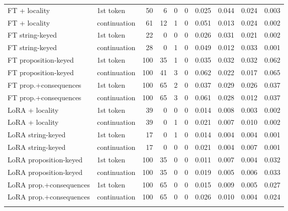 \begin{tabular}{llrrrrrrrr}
FT + locality & 1st token & 50 & 6 & 0 & 0 & 0.025 & 0.044 & 0.024 & 0.003 \\
FT + locality & continuation & 61 & 12 & 1 & 0 & 0.051 & 0.013 & 0.024 & 0.002 \\
FT string-keyed & 1st token & 22 & 0 & 0 & 0 & 0.026 & 0.031 & 0.021 & 0.002 \\
FT string-keyed & continuation & 28 & 0 & 1 & 0 & 0.049 & 0.012 & 0.033 & 0.001 \\
FT proposition-keyed & 1st token & 100 & 35 & 1 & 0 & 0.035 & 0.032 & 0.032 & 0.062 \\
FT proposition-keyed & continuation & 100 & 41 & 3 & 0 & 0.062 & 0.022 & 0.017 & 0.065 \\
FT prop.+consequences & 1st token & 100 & 65 & 2 & 0 & 0.037 & 0.029 & 0.026 & 0.037 \\
FT prop.+consequences & continuation & 100 & 65 & 3 & 0 & 0.061 & 0.028 & 0.012 & 0.037 \\
LoRA + locality & 1st token & 39 & 0 & 0 & 0 & 0.014 & 0.008 & 0.003 & 0.002 \\
LoRA + locality & continuation & 39 & 0 & 1 & 0 & 0.021 & 0.007 & 0.010 & 0.002 \\
LoRA string-keyed & 1st token & 17 & 0 & 1 & 0 & 0.014 & 0.004 & 0.004 & 0.001 \\
LoRA string-keyed & continuation & 17 & 0 & 0 & 0 & 0.021 & 0.004 & 0.007 & 0.001 \\
LoRA proposition-keyed & 1st token & 100 & 35 & 0 & 0 & 0.011 & 0.007 & 0.004 & 0.032 \\
LoRA proposition-keyed & continuation & 100 & 35 & 0 & 0 & 0.019 & 0.005 & 0.006 & 0.033 \\
LoRA prop.+consequences & 1st token & 100 & 65 & 0 & 0 & 0.015 & 0.009 & 0.005 & 0.027 \\
LoRA prop.+consequences & continuation & 100 & 65 & 0 & 0 & 0.026 & 0.010 & 0.004 & 0.024 \\
\addlinespace[2pt]
\bottomrule
\end{tabular}
